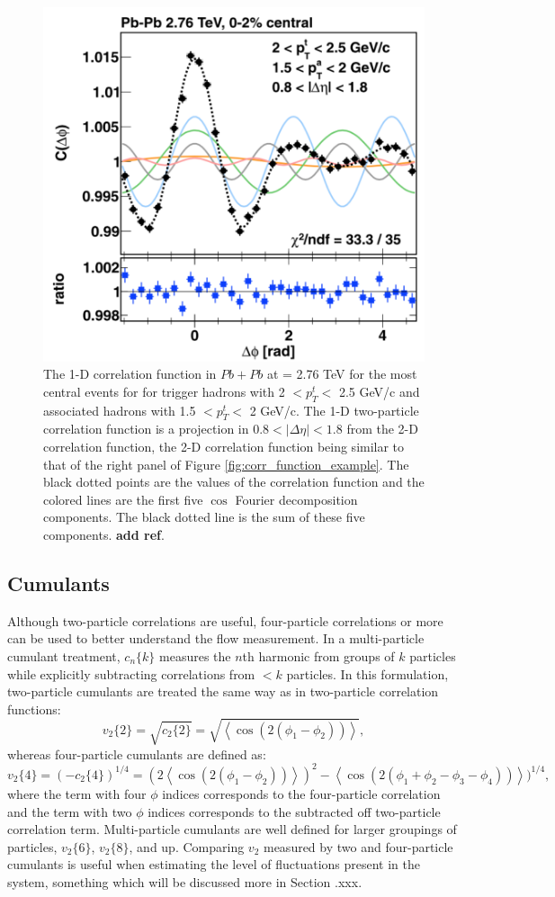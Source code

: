 \begin{figure}[!ht]
\begin{center}
\includegraphics[width=0.48\linewidth]{figs/1d_correlation_function_with_fourier.png}
\caption{The 1-D correlation function in $Pb+Pb$ at \sqsn = 2.76 TeV for the most central events for for trigger hadrons with 2 $<p_T^t<$ 2.5 GeV/c and associated hadrons with 1.5 $<p_T^t<$ 2 GeV/c. The 1-D two-particle correlation function is a projection in $0.8 < |\Delta\eta| < 1.8$ from the 2-D correlation function, the 2-D correlation function being similar to that of the right panel of Figure \ref{fig:corr_function_example}. The black dotted points are the values of the correlation function and the colored lines are the first five $\cos$ Fourier decomposition  components. The black dotted line is the sum of these five components. \textbf{add ref}.}
\label{fig:1d_corr_function_example_fourier}
\end{center}
\end{figure}

\subsection{Cumulants}
Although two-particle correlations are useful, four-particle correlations or more can be used to better understand the flow measurement. In a multi-particle cumulant treatment, $c_n\{k\}$ measures the $n$th harmonic from groups of $k$ particles while explicitly subtracting correlations from $< k$ particles. In this formulation, two-particle cumulants are treated the same way as in two-particle correlation functions:
\begin{equation}
v_2\{2\} = \sqrt{c_2\{2\}} = \sqrt{\left<\cos(2(\phi_1-\phi_2))\right>},
\label{eqn:v22}
\end{equation}
whereas four-particle cumulants are defined as:
\begin{equation}
v_2\{4\} = (-c_2\{4\})^{1/4} =  (2\left<\cos(2(\phi_1-\phi_2))\right>)^2 - \left<\cos(2(\phi_1 + \phi_2 - \phi_3 - \phi_4))\right>)^{1/4},
\label{eqn:v24}
\end{equation}
where the term with four $\phi$ indices corresponds to the four-particle correlation and the term with two $\phi$ indices corresponds to the subtracted off two-particle correlation term. Multi-particle cumulants are well defined for larger groupings of particles, $v_2\{6\}$, $v_2\{8\}$, and up. Comparing $v_2$ measured by two and four-particle cumulants is useful when estimating the level of fluctuations present in the system, something which will be discussed more in Section .xxx.
